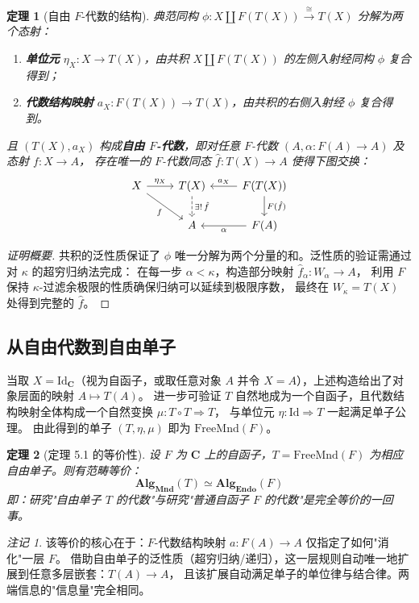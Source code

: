 \documentclass[UTF8,a4paper,12pt]{ctexart}
\theoremstyle{definition}
\theoremstyle{plain}
\newtheorem{theorem}{定理}[section]
\theoremstyle{remark}
\newtheorem{remark}{注记}[section]
\newcommand{\cat}[1]{\mathbf{#1}}
\newcommand{\Id}{\mathrm{Id}}
\newcommand{\Endo}{\mathbf{Endo}}
\newcommand{\Mnd}{\mathbf{Mnd}}
\newcommand{\FreeMnd}{\mathrm{FreeMnd}}
\newcommand{\Alg}{\mathbf{Alg}}
\begin{document}
\begin{theorem}[自由 $F$-代数的结构]\label{thm:free-algebra}
典范同构 $\phi: X \coprod F(T(X)) \xrightarrow{\cong} T(X)$ 分解为两个态射：
\begin{enumerate}
    \item \textbf{单位元} $\eta_X: X \to T(X)$，由共积 $X \coprod F(T(X))$ 的左侧入射经同构 $\phi$ 复合得到；
    \item \textbf{代数结构映射} $a_X: F(T(X)) \to T(X)$，由共积的右侧入射经 $\phi$ 复合得到。
\end{enumerate}
且 $(T(X), a_X)$ 构成\textbf{自由 $F$-代数}，即对任意 $F$-代数 $(A, \alpha: F(A) \to A)$ 及态射 $f: X \to A$，
存在唯一的 $F$-代数同态 $\hat{f}: T(X) \to A$ 使得下图交换：
\[
\begin{tikzcd}
X \ar[r, "\eta_X"] \ar[rd, "f"'] & T(X) \ar[d, dashed, "\exists!\,\hat{f}"] & F(T(X)) \ar[l, "a_X"'] \ar[d, "F(\hat{f})"] \\
& A & F(A) \ar[l, "\alpha"]
\end{tikzcd}
\]
\end{theorem}

\begin{proof}[证明概要]
共积的泛性质保证了 $\phi$ 唯一分解为两个分量的和。泛性质的验证需通过对 $\kappa$ 的超穷归纳法完成：
在每一步 $\alpha < \kappa$，构造部分映射 $\hat{f}_\alpha: W_\alpha \to A$，
利用 $F$ 保持 $\kappa$-过滤余极限的性质确保归纳可以延续到极限序数，
最终在 $W_\kappa = T(X)$ 处得到完整的 $\hat{f}$。
\end{proof}

\subsection{从自由代数到自由单子}

当取 $X = \Id_{\cat{C}}$（视为自函子，或取任意对象 $A$ 并令 $X = A$），上述构造给出了对象层面的映射 $A \mapsto T(A)$。
进一步可验证 $T$ 自然地成为一个自函子，且代数结构映射全体构成一个自然变换 $\mu: T \circ T \Rightarrow T$，
与单位元 $\eta: \Id \Rightarrow T$ 一起满足单子公理。
由此得到的单子 $(T, \eta, \mu)$ 即为 $\FreeMnd(F)$。

\begin{theorem}[定理 5.1 的等价性]
设 $F$ 为 $\cat{C}$ 上的自函子，$T = \FreeMnd(F)$ 为相应自由单子。则有范畴等价：
\[
\Alg_{\Mnd}(T) \simeq \Alg_{\Endo}(F)
\]
即：研究"自由单子 $T$ 的代数"与研究"普通自函子 $F$ 的代数"是完全等价的一回事。
\end{theorem}

\begin{remark}
该等价的核心在于：$F$-代数结构映射 $a: F(A) \to A$ 仅指定了如何"消化"一层 $F$。
借助自由单子的泛性质（超穷归纳/递归），这一层规则自动唯一地扩展到任意多层嵌套：$T(A) \to A$，
且该扩展自动满足单子的单位律与结合律。两端信息的"信息量"完全相同。
\end{remark}
\end{document}
